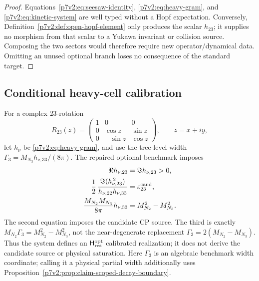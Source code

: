 \documentclass[11pt,a4paper]{article}
\newcommand{\Hresopt}{\mathsf H_{\rm res}^{\rm opt}}
\begin{document}
\begin{proof}
Equations~\eqref{p7v2:eq:seesaw-identity},
\eqref{p7v2:eq:heavy-gram}, and \eqref{p7v2:eq:kinetic-system} are well typed
without a Hopf expectation.  Conversely, Definition~\ref{p7v2:def:open-hopf-element}
only produces the scalar \(h_{23}\); it supplies no morphism from that scalar
to a Yukawa invariant or collision source.  Composing the two sectors would
therefore require new operator/dynamical data.  Omitting an unused optional
branch loses no consequence of the standard target.
\end{proof}

\subsection{Conditional heavy-cell calibration}
\label{p7v2:sec:heavy-cell}

\begin{definition}
\label{p7v2:def:heavy-calibration}
For a complex \(23\)-rotation
\[
 R_{23}(z)
 =
 \begin{pmatrix}
 1&0&0\\
 0&\cos z&\sin z\\
 0&-\sin z&\cos z
 \end{pmatrix},
 \qquad z=x+iy,
\]
let \(h_\nu\) be \eqref{p7v2:eq:heavy-gram}, and use the tree-level width
\(\Gamma_3=M_{N_3}h_{\nu,33}/(8\pi)\).  The repaired optional benchmark imposes
\begin{align}
\label{p7v2:eq:heavy-calibration}
 \Re h_{\nu,23}&=\Im h_{\nu,23}>0,\\
 \frac12\,
 \frac{\Im(h_{\nu,23}^{\,2})}
      {h_{\nu,22}h_{\nu,33}}
 &=\varepsilon_{23}^{\rm cand},\\
 \frac{M_{N_2}M_{N_3}}{8\pi}h_{\nu,33}
 &=M_{N_2}^2-M_{N_3}^2.
\end{align}
The second equation imposes the candidate CP source.  The third is exactly
\(M_{N_2}\Gamma_3=M_{N_2}^2-M_{N_3}^2\), not the near-degenerate replacement
\(\Gamma_3=2(M_{N_2}-M_{N_3})\).  Thus the system defines an
\(\Hresopt\) calibrated realization; it does not derive the candidate source
or physical saturation.  Here \(\Gamma_3\) is an algebraic benchmark width
coordinate; calling it a physical partial width additionally uses
Proposition~\ref{p7v2:prop:claim-scoped-decay-boundary}.
\end{definition}
\end{document}
